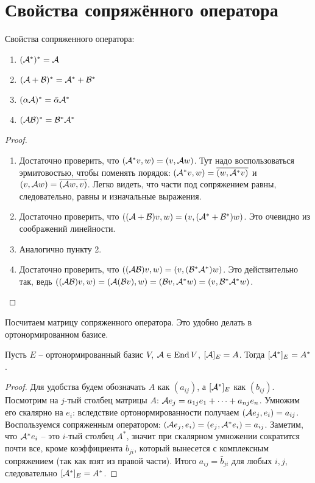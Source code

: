 \section{Свойства сопряжённого оператора}
\begin{theorem-non}
    Свойства сопряженного оператора:
    \begin{enumerate}
        \item $(\mathcal{A}^*)^* = \mathcal{A}$
        \item $(\mathcal{A} + \mathcal{B})^* = \mathcal{A}^* + \mathcal{B}^*$
        \item $(\alpha \mathcal{A})^* = \bar{\alpha} \mathcal{A}^*$
        \item $(\mathcal{A}\mathcal{B})^* = \mathcal{B}^*\mathcal{A}^*$
    \end{enumerate}
\end{theorem-non}
\begin{proof} \quad

    \begin{enumerate}
        \item Достаточно проверить, что $(\mathcal{A}^*v, w) = (v, \mathcal{A} w)$. Тут надо воспользоваться эрмитовостью, чтобы поменять порядок: $(\mathcal{A}^*v, w) = \overline{(w, \mathcal{A}^*v)}$ и $(v, \mathcal{A} w) = \overline{(\mathcal{A} w, v)}$. Легко видеть, что части под сопряжением равны, следовательно, равны и изначальные выражения.
        \item Достаточно проверить, что $((\mathcal{A} + \mathcal{B})v, w) = (v, (\mathcal{A}^* + \mathcal{B}^*)w)$. Это очевидно из соображений линейности.
        \item Аналогично пункту 2.
        \item Достаточно проверить, что $((\mathcal{A}\mathcal{B})v, w) = (v, (\mathcal{B}^*\mathcal{A}^*)w)$. Это действительно так, ведь $((\mathcal{A}\mathcal{B})v, w) = (\mathcal{A}(\mathcal{B} v), w) = (\mathcal{B} v, \mathcal{A}^*w) = (v, \mathcal{B}^*\mathcal{A}^*w)$.
    \end{enumerate}
\end{proof}

Посчитаем матрицу сопряженного оператора. Это удобно делать в ортонормированном базисе.
\begin{theorem-non}
    Пусть $E$ -- ортонормированный базис $V$, $\mathcal{A} \in \operatorname{End} V$, $[\mathcal{A}]_E = A$.
    Тогда $[\mathcal{A}^*]_E = A^*$.
\end{theorem-non}
\begin{proof}
    Для удобства будем обозначать $A$ как $(a_{ij})$, а $[\mathcal{A}^*]_E$ как $(b_{ij})$.
    Посмотрим на $j$-тый столбец матрицы $A$: $\mathcal{A} e_j = a_{1j}e_1 + \dots + a_{nj}e_n$.
    Умножим его скалярно на $e_i$: вследствие ортонормированности получаем $(\mathcal{A} e_j, e_i) = a_{ij}$. 
    Воспользуемся сопряженным оператором: $(\mathcal{A} e_j, e_i) = (e_j, \mathcal{A}^* e_i) = a_{ij}$. 
    Заметим, что $\mathcal{A}^* e_i$ -- это $i$-тый столбец $A^*$, значит при скалярном умножении сократится почти все, кроме коэффициента $b_{ji}$, который вынесется с комплексным сопряжением (так как взят из правой части).
    Итого $a_{ij} = \bar{b}_{ji}$ для любых $i, j$, следовательно $[\mathcal{A}^*]_E = A^*$.
\end{proof}